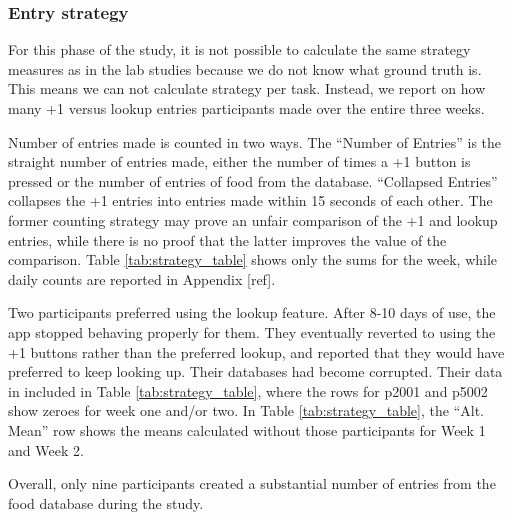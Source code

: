 \subsubsection{Entry strategy}
For this phase of the study, it is not possible to calculate the same strategy measures as in the lab studies because we do not know what ground truth is. This means we can not calculate strategy per task. Instead, we report on how many +1 versus lookup entries participants made over the entire three weeks. 

Number of entries made is counted in two ways. The ``Number of Entries'' is the straight number of entries made, either the number of times a +1 button is pressed or the number of entries of food from the database. ``Collapsed Entries'' collapses the +1 entries into entries made within 15 seconds of each other. The former counting strategy may prove an unfair comparison of the +1 and lookup entries, while there is no proof that the latter improves the value of the comparison. Table  \ref{tab:strategy_table} shows only the sums for the week, while daily counts are reported in Appendix [ref]. 

Two participants  preferred using the lookup feature. After 8-10 days of use, the app stopped behaving properly for them. They eventually reverted to using the +1 buttons rather than the preferred lookup, and reported that they would have preferred to keep looking up. Their databases had become corrupted. Their data in included in Table \ref{tab:strategy_table}, where the rows for p2001 and p5002 show zeroes for week one and/or two. In Table \ref{tab:strategy_table}, the ``Alt. Mean'' row shows the means calculated without those participants for Week 1 and Week 2. 

Overall, only nine participants created a substantial number of entries from the food database during the study.  

